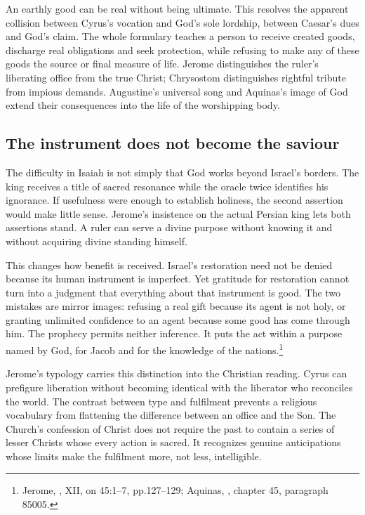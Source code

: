 \clearpage
{}
An earthly good can be real without being ultimate. This resolves the apparent collision between Cyrus's vocation and God's sole lordship, between Caesar's dues and God's claim. The whole formulary teaches a person to receive created goods, discharge real obligations and seek protection, while refusing to make any of these goods the source or final measure of life. Jerome distinguishes the ruler's liberating office from the true Christ; Chrysostom distinguishes rightful tribute from impious demands. Augustine's universal song and Aquinas's image of God extend their consequences into the life of the worshipping body.

\subsection{The instrument does not become the saviour}
The difficulty in Isaiah is not simply that God works beyond Israel's borders. The king receives a title of sacred resonance while the oracle twice identifies his ignorance. If usefulness were enough to establish holiness, the second assertion would make little sense. Jerome's insistence on the actual Persian king lets both assertions stand. A ruler can serve a divine purpose without knowing it and without acquiring divine standing himself.

This changes how benefit is received. Israel's restoration need not be denied because its human instrument is imperfect. Yet gratitude for restoration cannot turn into a judgment that everything about that instrument is good. The two mistakes are mirror images: refusing a real gift because its agent is not holy, or granting unlimited confidence to an agent because some good has come through him. The prophecy permits neither inference. It puts the act within a purpose named by God, for Jacob and for the knowledge of the nations.\footnote{Jerome, , XII, on 45:1--7, pp.127--129; Aquinas, , chapter 45, paragraph 85005.}

Jerome's typology carries this distinction into the Christian reading. Cyrus can prefigure liberation without becoming identical with the liberator who reconciles the world. The contrast between type and fulfilment prevents a religious vocabulary from flattening the difference between an office and the Son. The Church's confession of Christ does not require the past to contain a series of lesser Christs whose every action is sacred. It recognizes genuine anticipations whose limits make the fulfilment more, not less, intelligible.

